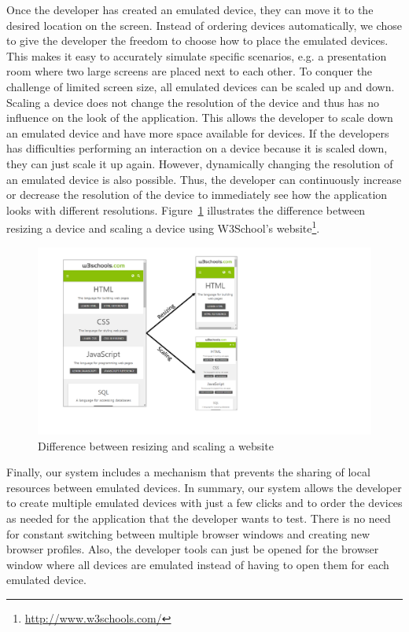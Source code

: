 Once the developer has created an emulated device, they can move it to the desired location on the screen. Instead of ordering devices automatically, we chose to give the developer the freedom to choose how to place the emulated devices. This makes it easy to accurately simulate specific scenarios, e.g. a presentation room where two large screens are placed next to each other. To conquer the challenge of limited screen size, all emulated devices can be scaled up and down. Scaling a device does not change the resolution of the device and thus has no influence on the look of the application. This allows the developer to scale down an emulated device and have more space available for devices. If the developers has difficulties performing an interaction on a device because it is scaled down, they can just scale it up again. However, dynamically changing the resolution of an emulated device is also possible. Thus, the developer can continuously increase or decrease the resolution of the device to immediately see how the application looks with different resolutions. Figure~\ref{fig:difference_resizing_scaling} illustrates the difference between resizing a device and scaling a device using W3School's website\footnote{\url{http://www.w3schools.com/}}.

\begin{figure}[H]
  \centering
    \includegraphics[width=1.0\textwidth]{images/difference_scaling_resizing.pdf}
	\caption{Difference between resizing and scaling a website}
	\label{fig:difference_resizing_scaling}
\end{figure}

Finally, our system includes a mechanism that prevents the sharing of local resources between emulated devices. In summary, our system allows the developer to create multiple emulated devices with just a few clicks and to order the devices as needed for the application that the developer wants to test. There is no need for constant switching between multiple browser windows and creating new browser profiles. Also, the developer tools can just be opened for the browser window where all devices are emulated instead of having to open them for each emulated device.
 

